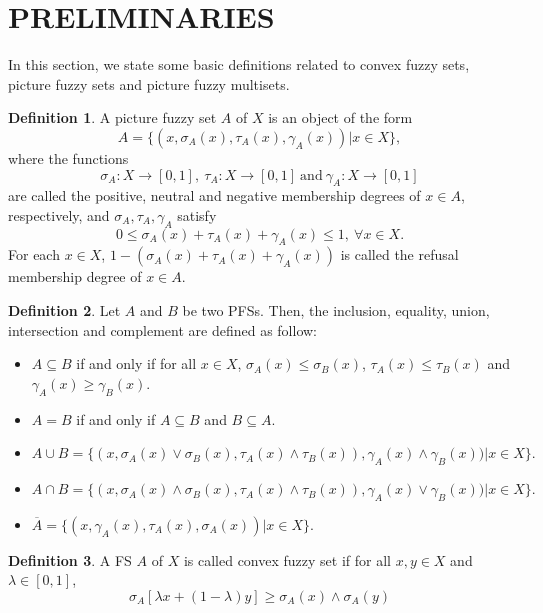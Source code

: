 \documentclass[12pt,letterpaper]{amsart}
\theoremstyle{plain}
\theoremstyle{definition}
\newtheorem{definition}{Definition}[section]
\numberwithin{equation}{section}
\begin{document}
\section{PRELIMINARIES}
In this section, we state some basic definitions related to convex fuzzy sets, picture fuzzy sets and picture fuzzy multisets.

\begin{definition} \cite{ck}
A picture fuzzy set $A$ of $X$ is an object of the form $$A = \lbrace (x, \sigma_{A}(x), \tau_{A}(x), \gamma_{A}(x))| x \in X \rbrace,$$ where the functions $$\sigma_{A}: X \rightarrow [0, 1],~ \tau_{A}: X \rightarrow [0, 1]~ \text{and}~ \gamma_{A}: X \rightarrow [0, 1]$$ 
are called the positive, neutral and negative membership degrees of $x \in A$, respectively, and $\sigma_{A}, \tau_{A}, \gamma_{A}$ satisfy $$0 \leq \sigma_{A}(x) + \tau_{A}(x) + \gamma_{A}(x) \leq 1,~ \forall x \in X.$$ For each $x \in X$, $1 - (\sigma_{A}(x) + \tau_{A}(x) + \gamma_{A}(x))$ is called the refusal membership degree of $x \in A$.  
\end{definition}

\begin{definition} \cite{ck}
Let $A$ and $B$ be two PFSs. Then, the inclusion, equality, union, intersection and complement are defined as follow:
\begin{itemize}
\item $A \subseteq B$ if and only if for all $x \in X$, $\sigma_{A}(x) \leq \sigma_{B}(x)$, $\tau_{A}(x) \leq \tau_{B}(x)$ and $\gamma_{A}(x) \geq \gamma_{B}(x).$
\item $A = B$ if and only if $A \subseteq B$ and $B \subseteq A.$ 
\item $A \cup B = \lbrace ( x, \sigma_{A}(x) \vee \sigma_B(x), \tau_A(x) \wedge \tau_B(x)), \gamma_A(x) \wedge \gamma_B(x)) | x \in X \rbrace.$
\item $A \cap B = \lbrace ( x, \sigma_{A}(x) \wedge \sigma_B(x), \tau_A(x) \wedge \tau_B(x)), \gamma_A(x) \vee \gamma_B(x)) | x \in X \rbrace.$
\item $\overline{A} = \lbrace (x, \gamma_{A}(x), \tau_{A}(x), \sigma_{A}(x))| x \in X \rbrace.$
\end{itemize}
\end{definition}

\begin{definition} \cite{z}
A FS $A$ of $X$ is called convex fuzzy set if for all $x, y \in X$ and $\lambda \in [0, 1]$,
$$\sigma_{A} [\lambda x + (1 - \lambda) y] \geq \sigma_{A}(x) \wedge \sigma_{A}(y)$$
\end{definition}
\end{document}
